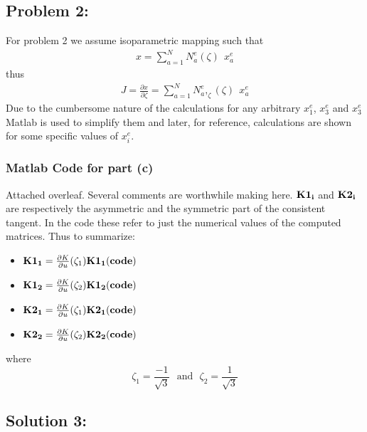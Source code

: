 \documentclass[11pt]{article}
\newcommand{\del}[2]{\frac{\partial {#1}}{\partial {#2}}}
\begin{document}
\subsection*{Problem 2:}
For problem 2 we assume isoparametric mapping such that
\begin{align*}
{x} = \sum\limits_{a=1}^{N} N^e_a (\zeta)\ \ x^e_a
\end{align*}
thus 
\begin{align*}
J = \del{x}{\zeta} =  \sum\limits_{a=1}^{N} N^e_a,_{\zeta} (\zeta)\ \ x^e_a
\end{align*}
Due to the cumbersome nature of the calculations for any arbitrary $x^e_1$, $x^e_3$ and $x^e_3$ Matlab is used to simplify them and later, for reference, calculations are shown for some specific values of $x^e_i$. 
\subsubsection*{Matlab Code for part (c)}
Attached overleaf. Several comments are worthwhile making here. $\bf K1_i$ and $\bf K2_i$ are respectively the asymmetric and the symmetric part of the consistent tangent. In the code these refer to just the numerical values of the computed matrices. Thus to summarize: 
\begin{itemize}
\item ${\bf K1_1} = \del{K}{u} (\zeta_1) {\bf K1_1 (code)}$
\item ${\bf K1_2} = \del{K}{u} (\zeta_2) {\bf K1_2 (code)}$
\item ${\bf K2_1} = \del{K}{u} (\zeta_1) {\bf K2_1 (code)}$
\item ${\bf K2_2} = \del{K}{u} (\zeta_2) {\bf K2_2 (code)}$
\end{itemize} 
where
$$\zeta_1 = \frac{-1}{\sqrt{3}}\ \ \  \text{and}\ \ \  \zeta_2 = \frac{1}{\sqrt{3}}$$

\subsection*{Solution 3:}
\end{document}
